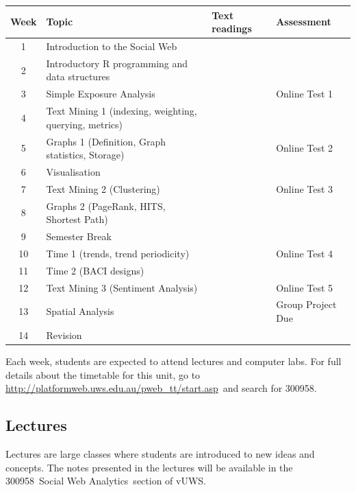 \documentclass[a4paper,oneside]{book}
\newcommand{\vuws}{vUWS}
\newcommand{\unitcode}{300958}
\newcommand{\unitname}{Social Web Analytics}
\newcommand{\timetablelink}{\url{http://platformweb.uws.edu.au/pweb_tt/start.asp}}
\begin{document}
\noindent
\renewcommand{\arraystretch}{1.3}
\begin{longtable}{|c|>{\raggedright}p{}|>{\raggedright}p{}|>{\raggedright\arraybackslash}p{}|}
\hline
Week & Topic & Text readings & Assessment \\
\hline
1 & Introduction to the Social Web  & & \\
\hline
2 & Introductory R programming and data structures &  & \\
\hline
3 & Simple Exposure Analysis &  & Online Test 1 \\
\hline
4 & Text Mining 1 (indexing, weighting, querying, metrics) &  &  \\
\hline
5 & Graphs 1 (Definition, Graph statistics, Storage) & &  Online Test 2 \\
\hline
6 & Visualisation &  &  \\
\hline                                            
7 & Text Mining 2 (Clustering) &  &  Online Test 3 \\
\hline                                            
8 & Graphs 2 (PageRank, HITS, Shortest Path) &  & \\
\hline
9 & Semester Break & &  \\
\hline                                             
10 & Time 1 (trends, trend periodicity)  & & Online Test 4 \\
\hline                                            
11 & Time 2 (BACI designs) &  & \\
\hline
12 & Text Mining 3 (Sentiment Analysis) &  & Online Test 5  \\
\hline
13 & Spatial Analysis &  & Group Project Due \\
\hline                                            
14 & Revision &  & \\                
\hline
\end{longtable}


Each week, students are expected to attend lectures and
computer labs. For full details about the timetable for this unit, go to
\timetablelink~and search for \unitcode.


\subsection*{Lectures}

Lectures are large classes where students are introduced to new ideas
and concepts. The notes presented in the lectures will be available in
the \unitcode~\unitname~section of \vuws.
\end{document}
